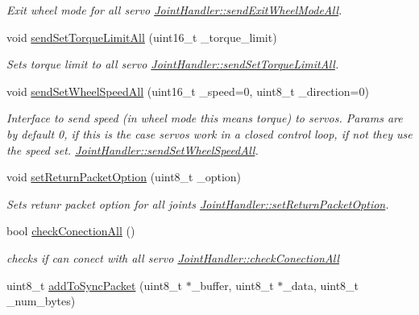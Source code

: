 \begin{DoxyCompactItemize}
\begin{DoxyCompactList}\small\item\em Exit wheel mode for all servo  \hyperlink{classJointHandler_a31299dcc02d8224d5f87255fcbcad99e}{Joint\+Handler\+::send\+Exit\+Wheel\+Mode\+All}. \end{DoxyCompactList}\item 
void \hyperlink{classJointHandler_aa0711667447671babd3b417385d3bbee}{send\+Set\+Torque\+Limit\+All} (uint16\+\_\+t \+\_\+torque\+\_\+limit)
\begin{DoxyCompactList}\small\item\em Sets torque limit to all servo  \hyperlink{classJointHandler_aa0711667447671babd3b417385d3bbee}{Joint\+Handler\+::send\+Set\+Torque\+Limit\+All}. \end{DoxyCompactList}\item 
void \hyperlink{classJointHandler_abd69485030fc62c47802fcb3cab8738a}{send\+Set\+Wheel\+Speed\+All} (uint16\+\_\+t \+\_\+speed=0, uint8\+\_\+t \+\_\+direction=0)
\begin{DoxyCompactList}\small\item\em Interface to send speed (in wheel mode this means torque) to servos. Params are by default 0, if this is the case servos work in a closed control loop, if not they use the speed set.  \hyperlink{classJointHandler_abd69485030fc62c47802fcb3cab8738a}{Joint\+Handler\+::send\+Set\+Wheel\+Speed\+All}. \end{DoxyCompactList}\item 
void \hyperlink{classJointHandler_acf3cb441ecda0e8cd6fcad4c513cd133}{set\+Return\+Packet\+Option} (uint8\+\_\+t \+\_\+option)
\begin{DoxyCompactList}\small\item\em Sets retunr packet option for all joints  \hyperlink{classJointHandler_acf3cb441ecda0e8cd6fcad4c513cd133}{Joint\+Handler\+::set\+Return\+Packet\+Option}. \end{DoxyCompactList}\item 
bool \hyperlink{classJointHandler_accde2d403ce4493a53192b2a0e9ce6a2}{check\+Conection\+All} ()
\begin{DoxyCompactList}\small\item\em checks if can conect with all servo  \hyperlink{classJointHandler_accde2d403ce4493a53192b2a0e9ce6a2}{Joint\+Handler\+::check\+Conection\+All} \end{DoxyCompactList}\item 
uint8\+\_\+t \hyperlink{classJointHandler_a32b4a64db24964d159890aa4560711db}{add\+To\+Sync\+Packet} (uint8\+\_\+t $\ast$\+\_\+buffer, uint8\+\_\+t $\ast$\+\_\+data, uint8\+\_\+t \+\_\+num\+\_\+bytes)

\end{DoxyCompactItemize}
